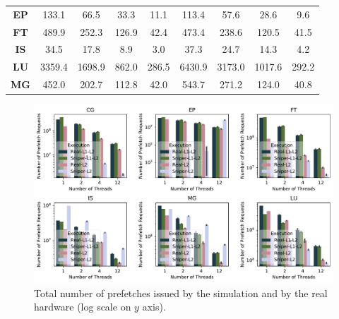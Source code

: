 \documentclass[AMA,final,STIX1COL]{WileyNJD-v2}
\begin{document}
\begin{table}[]
\begin{tabular}{@{}ccccccccc@{}}
\multicolumn{1}{c|}{\textbf{EP}}                            & 133.1  & 66.5   & 33.3  & \multicolumn{1}{c|}{11.1}  & 113.4     & 57.6     & 28.6     & 9.6     \\
\multicolumn{1}{c|}{\textbf{FT}}                            & 489.9  & 252.3  & 126.9 & \multicolumn{1}{c|}{42.4}  & 473.4     & 238.6    & 120.5    & 41.5    \\
\multicolumn{1}{c|}{\textbf{IS}}                            & 34.5   & 17.8   & 8.9   & \multicolumn{1}{c|}{3.0}   & 37.3      & 24.7     & 14.3     & 4.2     \\
\multicolumn{1}{c|}{\textbf{LU}}                            & 3359.4 & 1698.9 & 862.0 & \multicolumn{1}{c|}{286.5} & 6430.9    & 3173.0   & 1017.6   & 292.2   \\
\multicolumn{1}{c|}{\textbf{MG}}                            & 452.0  & 202.7  & 112.8 & \multicolumn{1}{c|}{42.0}  & 543.7     & 271.2    & 124.0    & 40.8   
\end{tabular}
\end{table}


\begin{figure}[b]
    \centering
    \includegraphics[width=.8\linewidth]{figures/sniper_l2-rqsts-all-pf.pdf}
    \caption{Total number of prefetches issued by the simulation and by the real hardware (log scale on $y$ axis).}
    \label{fig:sniper_l2-rqsts-all-pf}
\end{figure}
\end{document}
